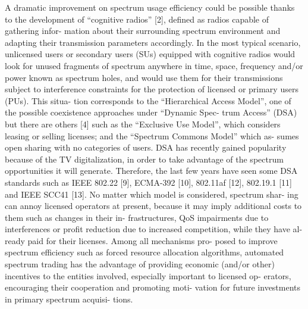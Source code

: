 A dramatic improvement on spectrum usage efficiency could be possible thanks to the development of “cognitive radios” [2], defined as radios capable of gathering infor- mation about their surrounding spectrum environment and adapting their transmission parameters accordingly. In the most typical scenario, unlicensed users or secondary users (SUs) equipped with cognitive radios would look for unused fragments of spectrum anywhere in time, space, frequency and/or power known as spectrum holes, and would use them for their transmissions subject to interference constraints for the protection of licensed or primary users (PUs). This situa- tion corresponds to the “Hierarchical Access Model”, one of the possible coexistence approaches under “Dynamic Spec- trum Access” (DSA) but there are others [4] such as the “Exclusive Use Model”, which considers leasing or selling licenses; and the “Spectrum Commons Model” which as- sumes open sharing with no categories of users.
DSA has recently gained popularity because of the TV digitalization, in order to take advantage of the spectrum opportunities it will generate. Therefore, the last few years have seen some DSA standards such as IEEE 802.22 [9], ECMA-392 [10], 802.11af [12], 802.19.1 [11] and IEEE SCC41 [13].
No matter which model is considered, spectrum shar- ing can annoy licensed operators at present, because it may imply additional costs to them such as changes in their in- frastructures, QoS impairments due to interferences or profit reduction due to increased competition, while they have al- ready paid for their licenses. Among all mechanisms pro- posed to improve spectrum efficiency such as forced resource allocation algorithms, automated spectrum trading has the advantage of providing economic (and/or other) incentives to the entities involved, especially important to licensed op- erators, encouraging their cooperation and promoting moti- vation for future investments in primary spectrum acquisi- tions.

